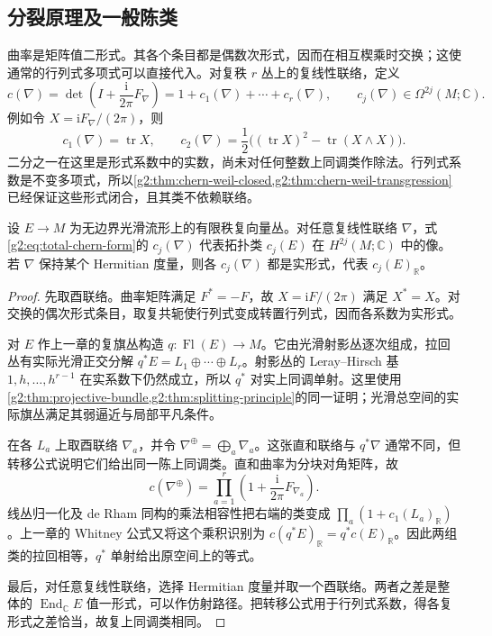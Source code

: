 \subsection{分裂原理及一般陈类}
\label{g2:subsec:2203:02}
曲率是矩阵值二形式。其各个条目都是偶数次形式，因而在相互楔乘时交换；这使通常的行列式多项式可以直接代入。对复秩 \(r\) 丛上的复线性联络，定义
\begin{equation}\label{g2:eq:total-chern-form}
	c(\nabla)=\det\!\left(I+\frac{\mathrm i}{2\pi}F_\nabla\right)
	=1+c_1(\nabla)+\cdots+c_r(\nabla),\qquad c_j(\nabla)\in\Omega^{2j}(M;\mathbb C).
\end{equation}
例如令 \(X=\mathrm iF_\nabla/(2\pi)\)，则
\[
	c_1(\nabla)=\operatorname{tr}X,\qquad
	c_2(\nabla)=\frac12\bigl((\operatorname{tr}X)^2-\operatorname{tr}(X\wedge X)\bigr).
\]
二分之一在这里是形式系数中的实数，尚未对任何整数上同调类作除法。行列式系数是不变多项式，所以\cref{g2:thm:chern-weil-closed,g2:thm:chern-weil-transgression}已经保证这些形式闭合，且其类不依赖联络。

\begin{theorem}\label{g2:thm:chern-weil-chern-comparison}
	设 \(E\to M\) 为无边界光滑流形上的有限秩复向量丛。对任意复线性联络 \(\nabla\)，式\eqref{g2:eq:total-chern-form}的 \(c_j(\nabla)\) 代表拓扑类 \(c_j(E)\) 在 \(H^{2j}(M;\mathbb C)\) 中的像。若 \(\nabla\) 保持某个 Hermitian 度量，则各 \(c_j(\nabla)\) 都是实形式，代表 \(c_j(E)_{\mathbb R}\)。
\end{theorem}
\begin{proof}
	先取酉联络。曲率矩阵满足 \(F^*=-F\)，故 \(X=\mathrm iF/(2\pi)\) 满足 \(X^*=X\)。对交换的偶次形式条目，取复共轭使行列式变成转置行列式，因而各系数为实形式。

	对 \(E\) 作上一章的复旗丛构造 \(q:\operatorname{Fl}(E)\to M\)。它由光滑射影丛逐次组成，拉回丛有实际光滑正交分解 \(q^*E=L_1\oplus\cdots\oplus L_r\)。射影丛的 Leray--Hirsch 基 \(1,h,\ldots,h^{r-1}\) 在实系数下仍然成立，所以 \(q^*\) 对实上同调单射。这里使用\cref{g2:thm:projective-bundle,g2:thm:splitting-principle}的同一证明；光滑总空间的实际旗丛满足其弱逼近与局部平凡条件。

	在各 \(L_a\) 上取酉联络 \(\nabla_a\)，并令 \(\nabla^\oplus=\bigoplus_a\nabla_a\)。这张直和联络与 \(q^*\nabla\) 通常不同，但转移公式说明它们给出同一陈上同调类。直和曲率为分块对角矩阵，故
	\[
		c(\nabla^\oplus)=\prod_{a=1}^r\left(1+\frac{\mathrm i}{2\pi}F_{\nabla_a}\right).
	\]
	线丛归一化及 de Rham 同构的乘法相容性把右端的类变成 \(\prod_a(1+c_1(L_a)_{\mathbb R})\)。上一章的 Whitney 公式又将这个乘积识别为 \(c(q^*E)_{\mathbb R}=q^*c(E)_{\mathbb R}\)。因此两组类的拉回相等，\(q^*\) 单射给出原空间上的等式。

	最后，对任意复线性联络，选择 Hermitian 度量并取一个酉联络。两者之差是整体的 \(\operatorname{End}_{\mathbb C}E\) 值一形式，可以作仿射路径。把转移公式用于行列式系数，得各复形式之差恰当，故复上同调类相同。
\end{proof}

